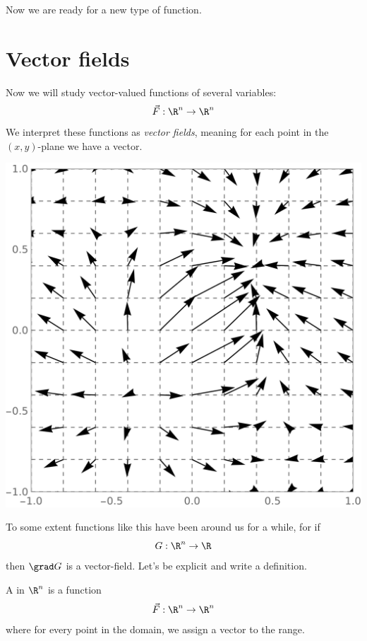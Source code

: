 \documentclass{ximera}
\begin{document}
Now we are ready for a new type of function.

\section{Vector fields}


Now we will study vector-valued functions of several variables:
\[
\vec{F}:\R^n\to \R^n
\]
We interpret these functions as \textit{vector fields}, meaning for
each point in the $(x,y)$-plane we have a vector.
\begin{image}
  \includegraphics{egField.png}
\end{image}
To some extent functions like this have been around us for a while,
for if
\[
G:\R^n\to\R
\]
then $\grad G$ is a vector-field.  Let's be explicit and write a definition.
\begin{definition}
  A  in $\R^n$ is a function
  \[
  \vec{F}: \R^n\to\R^n
  \]
  where for every point in the domain, we assign a vector to the range. 
\end{definition}
\end{document}
